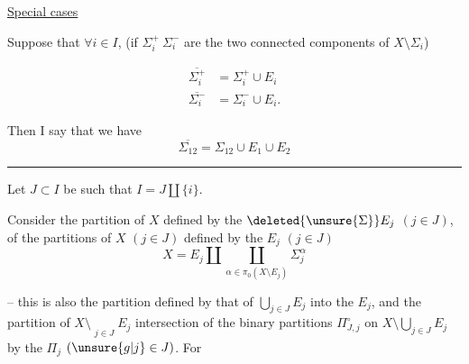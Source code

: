 \uline{Special cases}

Suppose that $\forall i\in I$,   (if $\Sigma_i^+\ \Sigma_i^-$ are the two connected components of $X\setminus\Sigma_i$)

\[
\begin{aligned}
\overline{\Sigma_i^+} &= \Sigma_i^+\cup E_i\\
\overline{\Sigma_i^-} &= \Sigma_i^-\cup E_i .
\end{aligned}
\]

Then I say that we have
\[
\overline{\Sigma_{12}}=\Sigma_{12}\cup E_1\cup E_2
\]

\noindent\rule{2.4cm}{0.3pt}\par

\reversemarginpar
{}
\normalmarginpar
{}

Let $J\subset I$ be such that $I=J\amalg\{i\}$.

Consider the partition  of $X$  defined by the $\deleted{\unsure{\Sigma}}E_j$ $(j\in J)$,   of the partitions  of $X$ $(j\in J)$ defined by the $E_j$  $(j\in J)$
\[
X=E_j\amalg\coprod_{\alpha\in\pi_0(X\setminus E_j)}\Sigma_j^\alpha
\]

-- this is also the partition defined by that of $\displaystyle\bigcup_{j\in J}E_j$ into the $E_j$, and the partition  of $\displaystyle X\setminus\mathop{\overline{\bigcup}}\limits_{j\in J}E_j$ intersection of the binary partitions $\Pi_{J,j}^{\circ}$   on  $\displaystyle X\setminus\bigcup_{j\in J}E_j$ by the $\Pi_j$ $(\unsure{g|j}\in J)$. For 
